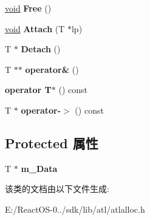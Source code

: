 \begin{DoxyCompactItemize}
\hyperlink{interfacevoid}{void} {\bfseries Free} ()
\item 
\mbox{\label{class_c_heap_ptr_af4f362b21e37a77a074ccfbc56d6dd7b}} 
\hyperlink{interfacevoid}{void} {\bfseries Attach} (T $\ast$lp)
\item 
\mbox{\label{class_c_heap_ptr_a922d83e68f8444b219118fbd5447e1b9}} 
T $\ast$ {\bfseries Detach} ()
\item 
\mbox{\label{class_c_heap_ptr_a4cb15a7ec9827d27a0530faf3bae5629}} 
T $\ast$$\ast$ {\bfseries operator\&} ()
\item 
\mbox{\label{class_c_heap_ptr_a02f0f8c064ad166d5d85212bf2c829b5}} 
{\bfseries operator T$\ast$} () const
\item 
\mbox{\label{class_c_heap_ptr_ad59c300f49b25486d693676676d2191c}} 
T $\ast$ {\bfseries operator-\/$>$} () const
\end{DoxyCompactItemize}
\subsection*{Protected 属性}
\begin{DoxyCompactItemize}
\item 
\mbox{\label{class_c_heap_ptr_ac1c65ab9d9ee9b40e37973d629c37030}} 
T $\ast$ {\bfseries m\+\_\+\+Data}
\end{DoxyCompactItemize}


该类的文档由以下文件生成\+:\begin{DoxyCompactItemize}
\item 
E\+:/\+React\+O\+S-\/0../sdk/lib/atl/atlalloc.\+h\end{DoxyCompactItemize}
